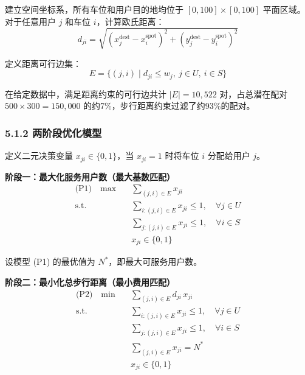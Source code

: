 \documentclass{ctexart}
\begin{document}
建立空间坐标系，所有车位和用户目的地均位于 $[0,100]\times[0,100]$ 平面区域。对于任意用户 $j$ 和车位 $i$，计算欧氏距离：
\begin{equation}
  d_{ji} = \sqrt{(x_j^{\text{dest}} - x_i^{\text{spot}})^2 + (y_j^{\text{dest}} - y_i^{\text{spot}})^2} \label{eq:dist}
\end{equation}

定义距离可行边集：
\begin{equation}
  E = \{(j,i) \mid d_{ji} \le w_j,\ j\in U,\ i\in S\} \label{eq:edge_set}
\end{equation}

在给定数据中，满足距离约束的可行边共计 $|E| = 10,522$ 对，占总潜在配对 $500\times300 = 150,000$ 的约7\%，步行距离约束过滤了约93\%的配对。

\subsubsection*{5.1.2 两阶段优化模型}

定义二元决策变量 $x_{ji} \in \{0,1\}$，当 $x_{ji}=1$ 时将车位 $i$ 分配给用户 $j$。

\textbf{阶段一：最大化服务用户数（最大基数匹配）}
\begin{equation}
  \begin{aligned}
    \text{(P1)}\quad \max\quad & \sum_{(j,i)\in E} x_{ji}                              \\
    \text{s.t.}\quad           & \sum_{i:(j,i)\in E} x_{ji} \le 1,\quad \forall j\in U \\
                               & \sum_{j:(j,i)\in E} x_{ji} \le 1,\quad \forall i\in S \\
                               & x_{ji}\in\{0,1\}
  \end{aligned}\label{eq:q1_p1}
\end{equation}

设模型 (P1) 的最优值为 $N^*$，即最大可服务用户数。

\textbf{阶段二：最小化总步行距离（最小费用匹配）}
\begin{equation}
  \begin{aligned}
    \text{(P2)}\quad \min\quad & \sum_{(j,i)\in E} d_{ji}\,x_{ji}                      \\
    \text{s.t.}\quad           & \sum_{i:(j,i)\in E} x_{ji} \le 1,\quad \forall j\in U \\
                               & \sum_{j:(j,i)\in E} x_{ji} \le 1,\quad \forall i\in S \\
                               & \sum_{(j,i)\in E} x_{ji} = N^*                        \\
                               & x_{ji}\in\{0,1\}
  \end{aligned}\label{eq:q1_p2}
\end{equation}
\end{document}
